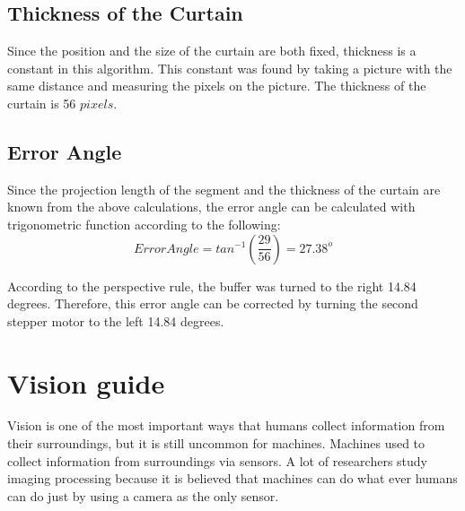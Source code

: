 \documentclass[letterpaper,12pt,oneside]{book}
\begin{document}
		\subsection{Thickness of the Curtain}
			
		Since the position and the size of the curtain are both fixed, thickness is a constant in this algorithm. This constant was found by taking a picture with the same distance and measuring the pixels on the picture. The thickness of the curtain is 56 $pixels$.
			
		\subsection{Error Angle}
			
		Since the projection length of the segment and the thickness of the curtain are known from the above calculations, the error angle can be calculated with trigonometric function according to the following:
		\begin{equation}
			Error Angle = tan^{-1}(\frac{29}{56}) = 27.38^o
		\end{equation}

		According to the perspective rule, the buffer was turned to the right 14.84 degrees. Therefore, this error angle can be corrected by turning the second stepper motor to the left 14.84 degrees. 
		\iffalse
		\section{Vision guide}
		Vision is one of the most important ways that humans collect information from their surroundings, but it is still uncommon for machines. Machines used to collect information from surroundings via sensors. A lot of researchers study imaging processing because it is believed that machines can do what ever humans can do just by using a camera as the only sensor. 
		
\end{document}
